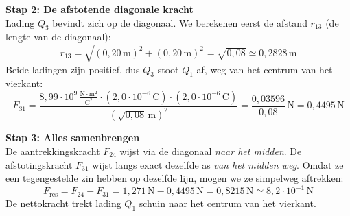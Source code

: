 \documentclass{ximera}
\begin{document}
\begin{exercise}
\begin{question}
\begin{solution}
            \textbf{Stap 2: De afstotende diagonale kracht}\\
            Lading $Q_3$ bevindt zich op de diagonaal. We berekenen eerst de afstand $r_{13}$ (de lengte van de diagonaal):
            \[
                r_{13} = \sqrt{(0{,}20\,\mathrm{m})^2 + (0{,}20\,\mathrm{m})^2} = \sqrt{0{,}08} \simeq 0{,}2828 \, \mathrm{m}
            \]
            Beide ladingen zijn positief, dus $Q_3$ stoot $Q_1$ af, weg van het centrum van het vierkant:
            \[
                F_{31} = \frac{8{,}99 \cdot 10^9\, \mathrm{\frac{N \cdot m^2}{C^2}} \cdot (2{,}0 \cdot 10^{-6}\,\mathrm{C}) \cdot (2{,}0 \cdot 10^{-6}\,\mathrm{C})}{(\sqrt{0{,}08}\,\mathrm{m})^2} = \frac{0{,}03596}{0{,}08}\,\mathrm{N} = 0{,}4495 \, \mathrm{N}
            \]

            \textbf{Stap 3: Alles samenbrengen}\\
            De aantrekkingskracht $F_{24}$ wijst via de diagonaal \emph{naar het midden}.
            De afstotingskracht $F_{31}$ wijst langs exact dezelfde as \emph{van het midden weg}.
            Omdat ze een tegengestelde zin hebben op dezelfde lijn, mogen we ze simpelweg aftrekken:
            \[
                F_{\text{res}} = F_{24} - F_{31} = 1{,}271 \, \mathrm{N} - 0{,}4495 \, \mathrm{N} = 0{,}8215 \, \mathrm{N} \simeq \boxed{8{,}2 \cdot 10^{-1} \, \mathrm{N}}
            \]
            De nettokracht trekt lading $Q_1$ schuin naar het centrum van het vierkant.
        \end{solution}
    \end{question}
\end{exercise}
\end{document}
